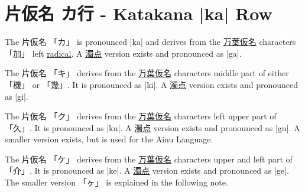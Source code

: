 \section{片仮名 カ行 - Katakana |ka| Row}  \label{sec:KatakanaNaRow}


 The  片仮名 {「カ」} is pronounced  |ka| and  derives from the
\hyperref[sec:Manyogana]{万葉仮名} characters {「加」} left
\hyperref[sec:Radical]{radical}.  A \hyperref[sec:Dakuten]{濁点} version exists
and pronounced as |ga|.




 The 片仮名 {「キ」} derives from the
\hyperref[sec:Manyogana]{万葉仮名} characters middle part of either {「機」} or
{「幾」}.  It is pronounced as |ki|.  A \hyperref[sec:Dakuten]{濁点} version
exists and pronounced as |gi|.


 The 片仮名 {「ク」} derives from the
\hyperref[sec:Manyogana]{万葉仮名} characters left upper part of {「久」}.  It
is pronounced as |ku|.  A \hyperref[sec:Dakuten]{濁点} version exists and
pronounced as |gu|.  A smaller version exists, but is used for the Ainu
Language.



 The 片仮名 {「ケ」} derives from the
\hyperref[sec:Manyogana]{万葉仮名} characters upper and left part of {「介」}.
It is pronounced as |ke|.  A \hyperref[sec:Dakuten]{濁点} version exists and
pronounced as |ge|.  The smaller version {「ヶ」} is explained in the following
note.

\newpage


